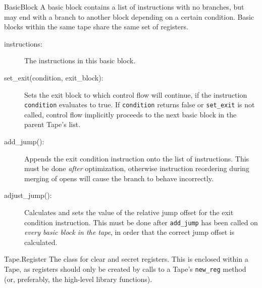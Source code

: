 \begin{class}{BasicBlock}
A basic block contains a list of instructions with no branches, but may
end with a branch to another block depending on a certain condition. Basic
blocks within the same tape share the same set of registers.
\begin{description}
\item[instructions:] The instructions in this basic block. 
\item[set_exit(condition, exit_block):] Sets the exit block to which control
flow will continue, if the instruction \verb|condition| evaluates to true.
If \verb|condition| returns false
or \verb|set_exit| is not called, control flow implicitly
proceeds to the next basic block in the parent Tape's list.
\item[add_jump():] Appends the exit condition instruction onto the list of
instructions. This must be done \emph{after} optimization, otherwise instruction
reordering during merging of opens will cause the branch to behave incorrectly.
\item[adjust_jump():] Calculates and sets the value of the relative jump
offset for the exit
condition instruction. This must be done after \verb|add_jump| has been called
on \emph{every basic block in the tape}, in order that the correct jump offset
is calculated.
\end{description}
\end{class}

\begin{class}{Tape.Register}
The class for clear and secret registers. This is enclosed within a Tape, as
registers should only be created by calls to a Tape's \verb|new_reg| method
(or, preferably, the high-level library functions).
\end{class}

